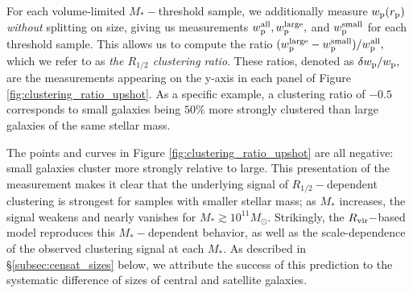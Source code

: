 \documentclass[usenatbib,usegraphicx,letterpaper]{mn2e}
\newcommand{\rhalf}{R_{1/2}}
\newcommand{\mstar}{M_{\ast}}
\newcommand{\rvir}{R_{\rm vir}}
\newcommand{\rproj}{r_{\rm p}}
\newcommand{\wproj}{w_{\rm p}}
\newcommand{\wplarge}{w_{\rm p}^{\rm large}}
\newcommand{\wpsmall}{w_{\rm p}^{\rm small}}
\newcommand{\wpall}{w_{\rm p}^{\rm all}}
\newcommand{\msun}{M_\odot}
\begin{document}
For each volume-limited $\mstar-$threshold sample, we additionally measure $\wproj(\rproj)$ {\em without} splitting on size, giving us measurements $\wpall, \wplarge,$ and $\wpsmall$ for each threshold sample. This allows us to compute the ratio $(\wplarge-\wpsmall)/\wpall,$ which we refer to as {\em the $\rhalf$ clustering ratio}. These ratios, denoted as $\delta\wproj/\wproj,$ are the measurements appearing on the y-axis in each panel of Figure \ref{fig:clustering_ratio_upshot}. As a specific example, a clustering ratio of $-0.5$ corresponds to small galaxies being $50\%$ more strongly clustered than large galaxies of the same stellar mass. 

The points and curves in Figure \ref{fig:clustering_ratio_upshot} are all negative: small galaxies cluster more strongly relative to large. This presentation of the measurement makes it clear that the underlying signal of $\rhalf-$dependent clustering is strongest for samples with smaller stellar mass; as $\mstar$ increases, the signal weakens and nearly vanishes for $\mstar\gtrsim10^{11}\msun.$ Strikingly, the $\rvir-$based model reproduces this $\mstar-$dependent behavior, as well as the scale-dependence of the observed clustering signal at each $\mstar.$ As described in \S\ref{subsec:censat_sizes} below, we attribute the success of this prediction to the systematic difference of sizes of central and satellite galaxies.

\end{document}
